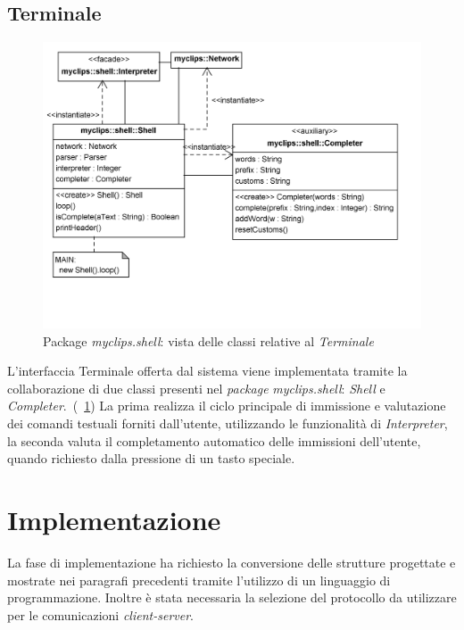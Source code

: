 \subsection{Terminale}

\begin{figure}[h]
\centering
\includegraphics[width=1\textwidth]{Immagini/Capitolo3/Classi/myclips_shell_Shell.png}
\caption{Package \emph{myclips.shell}: vista delle classi relative al \emph{Terminale}}\label{fig:class-myclips-shell-Shell}
\end{figure}

L'interfaccia Terminale offerta dal sistema viene implementata tramite la collaborazione di due classi presenti nel \emph{package} \emph{myclips.shell}: \emph{Shell} e \emph{Completer}.~(\figurename~\ref{fig:class-myclips-shell-Shell})
La prima realizza il ciclo principale di immissione e valutazione dei comandi testuali forniti dall'utente, utilizzando le funzionalità di \emph{Interpreter}, la seconda valuta il completamento automatico delle immissioni dell'utente, quando richiesto dalla pressione di un tasto speciale.


\section{Implementazione}

La fase di implementazione ha richiesto la conversione delle strutture progettate e mostrate nei paragrafi precedenti tramite l'utilizzo di un linguaggio di programmazione. Inoltre è stata necessaria la selezione del protocollo da utilizzare per le comunicazioni \emph{client-server}.

